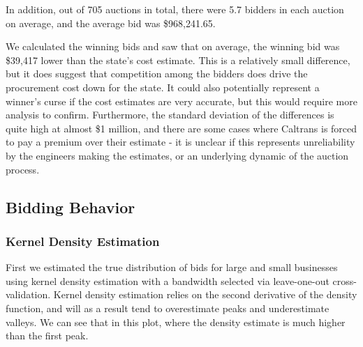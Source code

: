 In addition, out of 705 auctions in total, there were 5.7 bidders in
each auction on average, and the average bid was \$968,241.65.

We calculated the winning bids and saw that on average, the winning bid was
\$39,417 lower than the state's cost estimate. This is a relatively small
difference, but it does suggest that competition among the bidders does drive
the procurement cost down for the state. It could also potentially
represent a winner's curse if the cost estimates are very accurate,
but this would require more analysis to confirm.
Furthermore, the standard deviation of the differences is quite high
at almost \$1 million, and there are some cases where Caltrans
is forced to pay a premium over their estimate - it is unclear if this
represents unreliability by the engineers making the estimates,
or an underlying dynamic of the auction process.

\subsection{Bidding Behavior}

%

\subsubsection{Kernel Density Estimation}

First we estimated the true distribution of bids for large and
small businesses using kernel density estimation with a bandwidth
selected via leave-one-out cross-validation.
Kernel density estimation relies on the second derivative of the
density function, and will as a result tend to overestimate peaks and
underestimate valleys. We can see that in this plot, where
the density estimate is much higher than the first peak.

